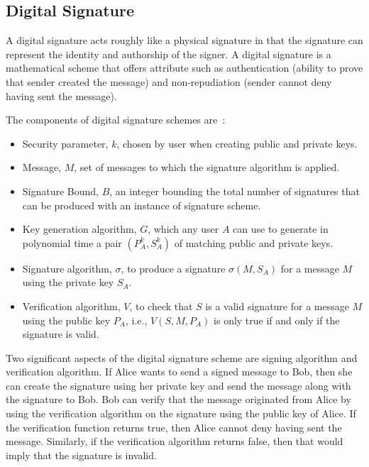 \subsection{Digital Signature} \label{subsec:digitalsignature}
A digital signature acts roughly like a physical signature in that the
signature can represent the identity and authorship of the signer. A digital
signature is a mathematical scheme that offers attribute such as authentication
(ability to prove that sender created the message) and non-repudiation (sender
cannot deny having sent the message). \par
The components of digital signature schemes are~\cite{rivest1978method}: 
\begin{itemize}
	\item Security parameter, $k$, chosen by user when creating public and
		private keys.
	\item Message, $M$, set of messages to which the signature algorithm is
		applied.
	\item Signature Bound, $B$, an integer bounding the total number of
		signatures that can be produced with an instance of signature scheme.
	\item Key generation algorithm, $G$, which any user $A$ can use to generate
		in polynomial time a pair $(P^{k}_A, S^{k}_A)$ of matching public and
		private keys. 
	\item Signature algorithm, $\sigma$, to produce a signature $\sigma(M,
		S_{A})$ for a message $M$ using the private key $S_{A}$. 
	\item Verification algorithm, $V$, to check that $S$ is a valid signature
		for a message $M$ using the public key $P_{A}$, i.e., $V(S,M,P_A)$ is only
		true if and only if the signature is valid. 
\end{itemize}
Two significant aspects of the digital signature scheme are signing algorithm
and verification algorithm. If Alice wants to send a signed message to Bob,
then she can create the signature using her private key and send the message
along with the signature to Bob. Bob can verify that the message originated
from Alice by using the verification algorithm on the signature using the
public key of Alice. If the verification function returns true, then Alice
cannot deny having sent the message. Similarly, if the verification algorithm
returns false, then that would imply that the signature is invalid. \par   

